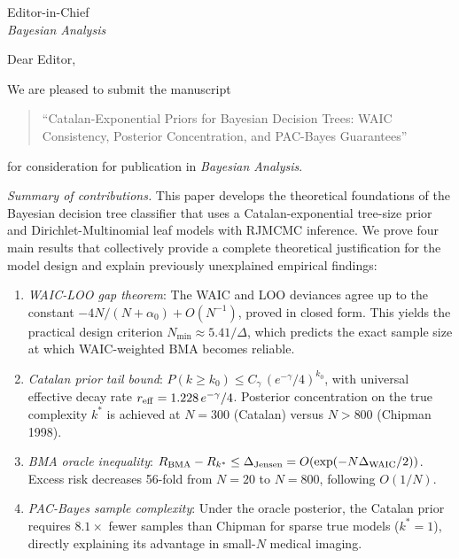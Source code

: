 \documentclass[12pt,a4paper]{article}
\begin{document}
\noindent
Editor-in-Chief\\
\textit{Bayesian Analysis}

\bigskip
\noindent Dear Editor,

\medskip
We are pleased to submit the manuscript

\begin{quote}
{``Catalan-Exponential Priors for Bayesian Decision Trees:
WAIC Consistency, Posterior Concentration, and PAC-Bayes Guarantees''}
\end{quote}

for consideration for publication in \textit{Bayesian Analysis}.

\medskip\noindent\textit{Summary of contributions.}\quad
This paper develops the theoretical foundations of the Bayesian decision tree classifier
that uses a Catalan-exponential tree-size prior and Dirichlet-Multinomial
leaf models with RJMCMC inference.
We prove four main results that collectively provide a complete theoretical
justification for the model design and explain previously unexplained empirical findings:

\begin{enumerate}
\item \textit{WAIC-LOO gap theorem}: The WAIC and LOO deviances agree
  up to the constant $-4N/(N+\alpha_0)+O(N^{-1})$, proved in closed form.
  This yields the practical design criterion $N_{\min} \approx 5.41/\Delta$,
  which predicts the exact sample size at which WAIC-weighted BMA
  becomes reliable.

\item \textit{Catalan prior tail bound}: $P(k \geq k_0) \leq C_\gamma\,(e^{-\gamma}/4)^{k_0}$,
  with universal effective decay rate $r_{\rm eff} = 1.228\,e^{-\gamma}/4$.
  Posterior concentration on the true complexity $k^*$ is achieved at $N=300$
  (Catalan) versus $N>800$ (Chipman 1998).

\item \textit{BMA oracle inequality}: $R_{\rm BMA}-R_{k^*} \leq \Delta_{\rm Jensen}
  = O(\exp(-N\Delta_{\rm WAIC}/2))$.
  Excess risk decreases 56-fold from $N=20$ to $N=800$, following $O(1/N)$.

\item \textit{PAC-Bayes sample complexity}: Under the oracle posterior,
  the Catalan prior requires $8.1\times$ fewer samples than Chipman for
  sparse true models ($k^*=1$), directly explaining its advantage in
  small-$N$ medical imaging.
\end{enumerate}
\end{document}
